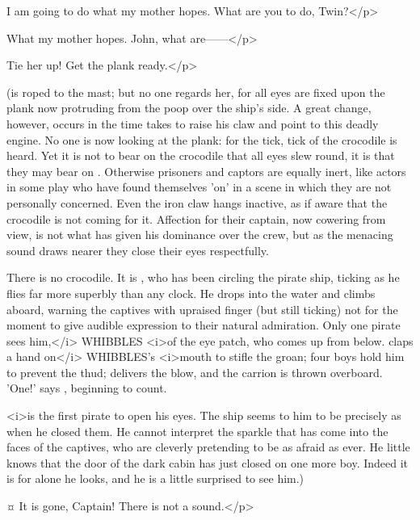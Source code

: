 \begin{drama}

\tootlesspeaks
I am going to do what my mother hopes.
What are you to do, Twin?</p>

\firsttwinspeaks
What my mother hopes.
John, what are——</p>

\hookspeaks
Tie her up!
Get the plank ready.</p>

\begin{stagedir}
(\wendy is roped to the mast;
but no one regards her, for all eyes are fixed upon the plank now protruding from the poop over the ship's side.
A great change, however, occurs in the time \hook takes to raise his claw and point to this deadly engine.
No one is now looking at the plank: for the tick, tick of the crocodile is heard.
Yet it is not to bear on the crocodile that all eyes slew round, it is that they may bear on \hook.
Otherwise prisoners and captors are equally inert,
like actors in some play who have found themselves 'on' in a scene in which they are not personally concerned.
Even the iron claw hangs inactive, as if aware that the crocodile is not coming for it.
Affection for their captain, now cowering from view, is not what has given \hook his dominance over the crew,
but as the menacing sound draws nearer they close their eyes respectfully.

There is no crocodile.
It is \peter, who has been circling the pirate ship, ticking as he flies far more superbly than any clock.
He drops into the water and climbs aboard, warning the captives with upraised finger (but still ticking)
not for the moment to give audible expression to their natural admiration.
Only one pirate sees him,</i> {\namefont WHIBBLES} <i>of the eye patch, who comes up from below.
\john claps a hand on</i> {\namefont WHIBBLES}'s <i>mouth to stifle the groan;
four boys hold him to prevent the thud;
\peter delivers the blow, and the carrion is thrown overboard.
'One!\@' says \slightly, beginning to count.

\starkey <i>is the first pirate to open his eyes.
The ship seems to him to be precisely as when he closed them.
He cannot interpret the sparkle that has come into the faces of the captives,
who are cleverly pretending to be as afraid as ever.
He little knows that the door of the dark cabin has just closed on one more boy.
Indeed it is for \hook alone he looks, and he is a little surprised to see him.)
\end{stagedir}

\starkeyspeaks {}¤
It is gone, Captain!
There is not a sound.</p>


\end{drama}
